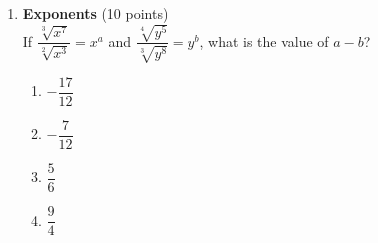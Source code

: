 \begin{enumerate}
  \item \textbf{Exponents} (10 points)\\
  If \(\dfrac{\sqrt[3]{x^7}}{\sqrt[2]{x^3}}=x^a\) and \(\dfrac{\sqrt[4]{y^5}}{\sqrt[3]{y^8}}=y^b\), what is the value of \(a-b\)?
  \begin{enumerate}[label=(\Alph*)]
    \item $-\dfrac{17}{12}$
    \item $-\dfrac{7}{12}$
    \item $\dfrac{5}{6}$
    \item $\dfrac{9}{4}$
  \end{enumerate}
  \begin{subanswer}
  \end{subanswer}








\end{enumerate}
